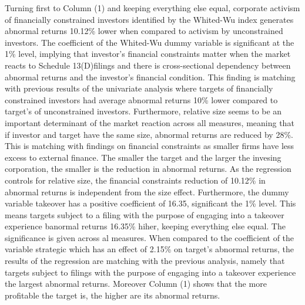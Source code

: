 \documentclass[12pt]{article}
\begin{document}
Turning first to Column (1) and keeping everything else equal, corporate activism of financially constrained investors identified by the Whited-Wu index generates abnormal returns 10.12\% lower when compared to activism by unconstrained investors. The coefficient of the Whited-Wu dummy variable is significant at the 1\% level, implying that investor's financial constraints matter when the market reacts to Schedule 13(D)filings and there is cross-sectional dependency between abnormal returns and the investor's financial condition.  This finding is matching with previous results of the univariate analysis where targets of financially constrained investors had average abnormal returns 10\% lower compared to target's of unconstrained investors. Furthermore, relative size seems to be an important determinant of the market reaction across all measures, meaning that if investor and target have the same size, abnormal returns are reduced by 28\%. This is matching with findings on financial constraints as smaller firms have less excess to external finance. The smaller the target and the larger the invesing corporation, the smaller is the reduction in abnormal returns. As the regression controls for relative size, the financial constraints reduction of 10.12\% in abnormal returns is independent from the size effect. Furthermore, the dummy variable takeover has a positive coefficient of 16.35, significant the 1\% level. This means targets subject to a filing with the purpose of engaging into a takeover experience banormal returns 16.35\% hiher, keeping everything else equal. The significance is given across al measures. When compared to the coefficient of the variable strategic which has an effect of 2.15\% on target's abnormal returns, the results of the regression are matching with the previous analysis, namely that targets subject to filings with the purpose of engaging into a takeover experience the largest abnormal returns. Moreover Column (1) shows that the more profitable the target is, the higher are its abnormal returns.
\end{document}
